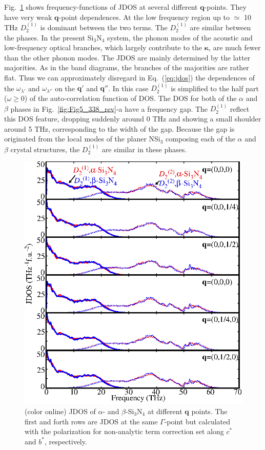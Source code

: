 \documentclass[twocolumn,amsmath,amssymb,a4paper,prb,superscriptaddress,floatfix]{revtex4-1}
\begin{document}
Fig.~\ref{fig:Fig6_338} shows frequency-functions of JDOS at several different
$\mathbf{q}$-points. They have very weak $\mathbf{q}$-point dependences. At the
low frequency region up to $\simeq$ 10 THz $D_2^{(1)}$ is dominant between the
two terms. The $D_2^{(1)}$ are similar between the phases.  In the present
Si$_3$N$_4$ system, the phonon modes of the acoustic and low-frequency optical
branches, which largely contribute to the $\boldsymbol{\kappa}$, are much fewer
than the other phonon modes.  The JDOS are mainly determined by the latter
majorities.
As in the band diagrams, the branches of the majorities are rather flat. Thus we
can approximately disregard in Eq.~(\ref{eq:jdos}) the dependences of the
$\omega_{\lambda'}$ and $\omega_{\lambda''}$ on the $\mathbf{q}'$ and
$\mathbf{q}''$.  In this case $D_2^{(1)}$ is simplified to the half part
($\omega \geq  0$) of the auto-correlation function of DOS. The DOS for both
of the $\alpha$ and $\beta$ phases in Fig.~\ref{fig:Fig5_338_rev}-a have a
frequency gap. The $D_2^{(1)}$ reflect this DOS feature, dropping suddenly
around 0 THz and showing a small shoulder around 5 THz, corresponding to the
width of the gap.  Because the gap is originated from the local modes of the
planer NSi$_3$ composing each of the $\alpha$ and $\beta$ crystal
structures,\cite{kuwabara} the $D_2^{(1)}$ are similar in these phases.  

\begin{figure}[ht]
 \centering
  \includegraphics[width=0.9\linewidth]{figure_jdoss.eps} \caption{(color
	  online) JDOS of $\alpha$- and $\beta$-Si$_3$N$_4$ at different $\mathbf q$ points.
  The first and forth rows are JDOS at the same $\Gamma$-point but calculated
  with the polarization for non-analytic term correction set along $c^*$ and
  $b^*$, respectively. \label{fig:Fig6_338} }
 \centering
\end{figure}
\end{document}
